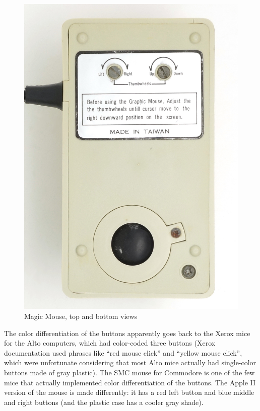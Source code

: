 \documentclass[11pt, a4paper]{article}
\begin{document}
\begin{figure}[h]
    \includegraphics[scale=0.73]{1985_smc_contriver_magic_mouse/bottom_30.jpg}
    \caption{Magic Mouse, top and bottom views}
    \label{fig:MagicMouseTopAndBottom}
\end{figure}

The color differentiation of the buttons apparently goes back to the Xerox mice for the Alto computers, which had color-coded three buttons (Xerox documentation used phrases like ``red mouse click'' and ``yellow mouse click'', which were unfortunate considering that most Alto mice actually had single-color buttons made of gray plastic). The SMC mouse for Commodore is one of the few mice that actually implemented color differentiation of the buttons. The Apple II version of the mouse is made differently: it has a red left button and blue middle and right buttons (and the plastic case has a cooler gray shade).
\end{document}
